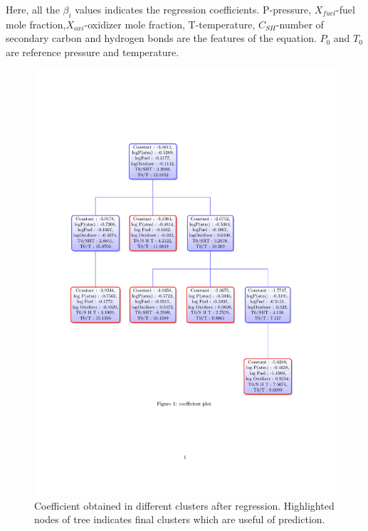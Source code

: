 \documentclass[12pt]{article}
\begin{document}
Here, all the $\beta_i$ values indicates the regression coefficients. {P-pressure, $X_{fuel}$-fuel mole fraction,$ X_{oxi}$-oxidizer mole fraction, T-temperature, $C_{SH}$-number of secondary carbon and hydrogen bonds} are the features of the equation. $P_0$ and $T_0$ are reference pressure and temperature. 

\begin{figure}[H]
	\centering
	\includegraphics[trim={2cm 7cm 0 3cm},clip,scale=0.9]{coefficient.pdf}
	\caption{Coefficient obtained in different clusters after regression. Highlighted nodes of tree indicates final clusters which are useful of prediction.}
	\label{fig:coef_tree}
\end{figure}
\end{document}
